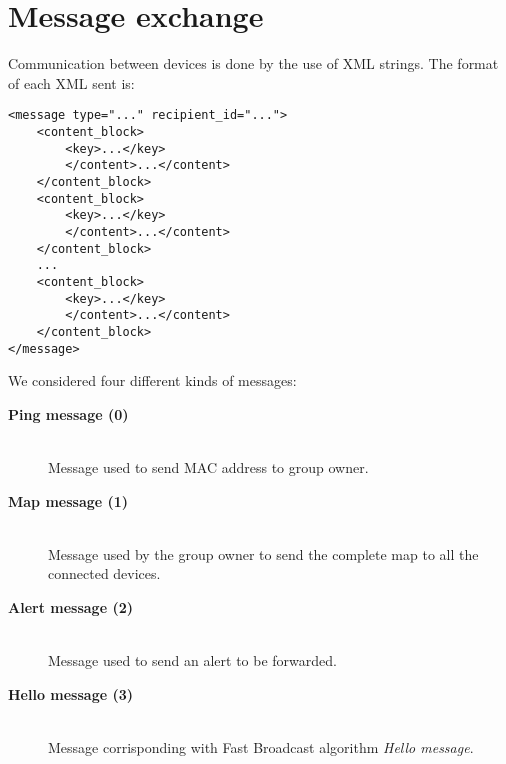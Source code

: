 \section{Message exchange}

Communication between devices is done by the use of XML strings. The format of each XML sent is:
\begin{verbatim}
<message type="..." recipient_id="...">
    <content_block>
        <key>...</key>
        </content>...</content>
    </content_block>
    <content_block>
        <key>...</key>
        </content>...</content>
    </content_block>
    ...
    <content_block>
        <key>...</key>
        </content>...</content>
    </content_block>
</message>
\end{verbatim}
We considered four different kinds of messages:
	\begin{description}
		\item[\textbf{Ping message (0)}] \hfill \\
		Message used to send MAC address to group owner.
		\item[\textbf{Map message (1)}] \hfill \\
		Message used by the group owner to send the complete  map to all the connected devices.
		\item[\textbf{Alert message (2)}] \hfill \\
		Message used to send an alert to be forwarded.
		\item[\textbf{Hello message (3)}] \hfill \\
		Message corrisponding with Fast Broadcast algorithm \textit{Hello message}.
	\end{description}
